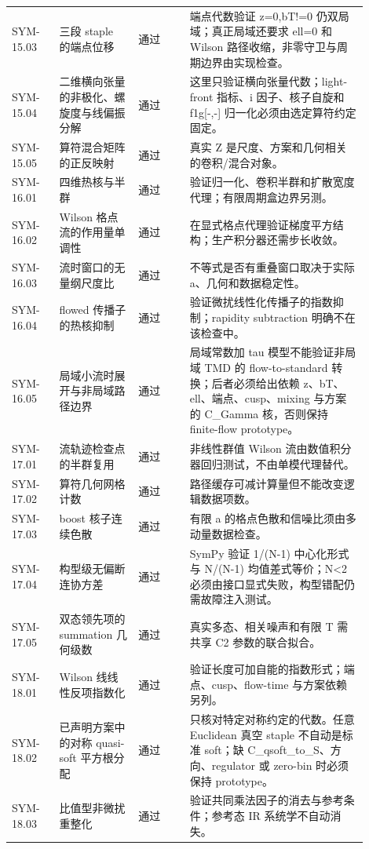 \begin{longtable}{p{0.12\linewidth}p{0.20\linewidth}p{0.13\linewidth}p{0.45\linewidth}}
SYM-15.03 & 三段 staple 的端点位移 & 通过 & 端点代数验证 z=0,bT!=0 仍双局域；真正局域还要求 ell=0 和 Wilson 路径收缩，非零守卫与周期边界由实现检查。\\
SYM-15.04 & 二维横向张量的非极化、螺旋度与线偏振分解 & 通过 & 这里只验证横向张量代数；light-front 指标、i 因子、核子自旋和 f1g[-,-] 归一化必须由选定算符约定固定。\\
SYM-15.05 & 算符混合矩阵的正反映射 & 通过 & 真实 Z 是尺度、方案和几何相关的卷积/混合对象。\\
SYM-16.01 & 四维热核与半群 & 通过 & 验证归一化、卷积半群和扩散宽度代理；有限周期盒边界另测。\\
SYM-16.02 & Wilson 格点流的作用量单调性 & 通过 & 在显式格点代理验证梯度平方结构；生产积分器还需步长收敛。\\
SYM-16.03 & 流时窗口的无量纲尺度比 & 通过 & 不等式是否有重叠窗口取决于实际 a、几何和数据稳定性。\\
SYM-16.04 & flowed 传播子的热核抑制 & 通过 & 验证微扰线性化传播子的指数抑制；rapidity subtraction 明确不在该检查中。\\
SYM-16.05 & 局域小流时展开与非局域路径边界 & 通过 & 局域常数加 tau 模型不能验证非局域 TMD 的 flow-to-standard 转换；后者必须给出依赖 z、bT、ell、端点、cusp、mixing 与方案的 C\_Gamma 核，否则保持 finite-flow prototype。\\
SYM-17.01 & 流轨迹检查点的半群复用 & 通过 & 非线性群值 Wilson 流由数值积分器回归测试，不由单模代理替代。\\
SYM-17.02 & 算符几何网格计数 & 通过 & 路径缓存可减计算量但不能改变逻辑数据项数。\\
SYM-17.03 & boost 核子连续色散 & 通过 & 有限 a 的格点色散和信噪比须由多动量数据检查。\\
SYM-17.04 & 构型级无偏断连协方差 & 通过 & SymPy 验证 1/(N-1) 中心化形式与 N/(N-1) 均值差式等价；N<2 必须由接口显式失败，构型错配仍需故障注入测试。\\
SYM-17.05 & 双态领先项的 summation 几何级数 & 通过 & 真实多态、相关噪声和有限 T 需共享 C2 参数的联合拟合。\\
SYM-18.01 & Wilson 线线性反项指数化 & 通过 & 验证长度可加自能的指数形式；端点、cusp、flow-time 与方案依赖另列。\\
SYM-18.02 & 已声明方案中的对称 quasi-soft 平方根分配 & 通过 & 只核对特定对称约定的代数。任意 Euclidean 真空 staple 不自动是标准 soft；缺 C\_qsoft\_to\_S、方向、regulator 或 zero-bin 时必须保持 prototype。\\
SYM-18.03 & 比值型非微扰重整化 & 通过 & 验证共同乘法因子的消去与参考条件；参考态 IR 系统学不自动消失。\\

\end{longtable}
